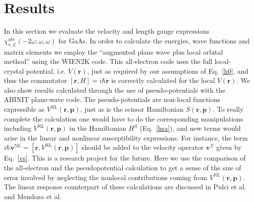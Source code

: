 \documentclass[floatfix,prb,aps,superscriptaddress,11pt]{revtex4}
\begin{document}

\section{Results}

\label{results}

In this section we evaluate the velocity and length gauge expressions 
$\chi _{\mathrm{v},L}^{abc}(-2\omega;\omega,\omega)$ for GaAs.
In
order to calculate the energies, wave functions and matrix elements we
employ the ``augmented plane wave plus local orbital method'' using the WIEN2K
code. \cite{wien2k}
 This all-electron code uses the full local-crystal
potential, i.e. $V(\mathbf{r})$, just as required by our assumptions of 
Eq.~\eqref{h0}, and thus the commutator $[\mathbf{r},H]=i\hbar
\dot{\mathbf{r}}$
is correctly calculated for the local $V(\mathbf{r})$. We also
show results calculated through the use of pseudo-potentials with the ABINIT
plane-wave code.\cite{gonzeCMS02} The pseudo-potentials are non-local
functions expressible as $V^{\mathrm{NL}}(\mathbf{r},\mathbf{p})$,\cite{staracePRA71}
just as is the scissor Hamiltonian $S(\mathbf{r},\mathbf{p})$. To really complete
the calculation one would have to do the corresponding manipulations
including $V^{\mathrm{NL}}(\mathbf{r},\mathbf{p})$ in the Hamiltonian $H^{S}$ 
(Eq.~\eqref{hsa}), and new terms would arise in the linear and nonlinear
susceptibility expressions. For instance, the term 
$i\hbar \mathbf{v}^{\mathrm{NL}}=[\mathbf{r},V^{\mathrm{NL}}(\mathbf{r},\mathbf{p})]$ should be added to the
velocity operator $\mathbf{v}^{\Sigma}$ given by Eq.~\eqref{vs}. This is a research
project for the future. 
Here we use the
comparison of the all-electron and the pseudopotential calculation
to get a sense of the size of error involved by neglecting
the nonlocal contributions coming from
$V^{\mathrm{NL}}(\mathbf{r},\mathbf{p})$. 
The
linear response counterpart of these calculations are 
discussed in Pulci et al.\cite{pulciPRB98} and Mendoza et al.\cite{mendozaPRB06} 
\end{document}

